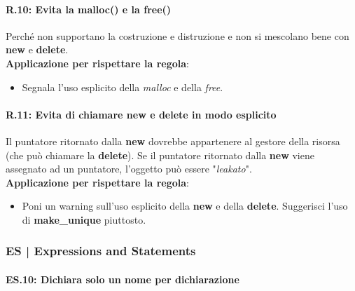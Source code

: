 \paragraph{R.10: Evita la malloc() e la free()}

\textsf{\small Perché non supportano la costruzione e distruzione e non si mescolano bene con \textbf{new} e \textbf{delete}.} \\

\textsf{\small \textbf{Applicazione per rispettare la regola}: }

\begin{itemize}
	\item \textsf{\small Segnala l'uso esplicito della \emph{malloc} e della \emph{free}.}
\end{itemize}

\paragraph{R.11: Evita di chiamare \textbf{new} e \textbf{delete} in modo esplicito}

\textsf{\small Il puntatore ritornato dalla \textbf{new} dovrebbe appartenere al gestore della risorsa (che può chiamare la \textbf{delete}). Se il puntatore ritornato dalla \textbf{new} viene assegnato ad un puntatore, l'oggetto può essere "\emph{leakato}".} \\

\textsf{\small \textbf{Applicazione per rispettare la regola}: }

\begin{itemize}
	\item \textsf{\small Poni un warning sull'uso esplicito della \textbf{new} e della \textbf{delete}. Suggerisci l'uso di \textbf{make\_unique} piuttosto.}
\end{itemize}


\newpage

\subsubsection{ES | Expressions and Statements}

\label{ES_10}

\paragraph{ES.10: Dichiara solo un nome per dichiarazione}

